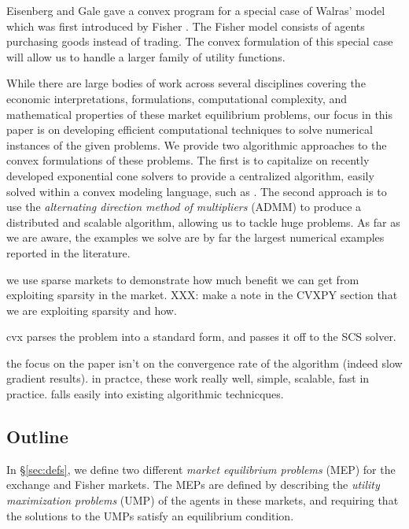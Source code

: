 \documentclass[12pt]{article}
\begin{document}
Eisenberg and Gale \cite{eisenberg1959consensus, gale1960theory,
eisenberg1961aggregation} gave a convex program for a special case of Walras'
model which was first introduced by Fisher \cite[see][]{brainard2000compute}.
The Fisher model consists of agents purchasing goods instead of trading.
The convex formulation of this special case will allow us to handle a larger
family of utility functions.

While there are large bodies of work across several disciplines covering the
economic interpretations, formulations, computational complexity, and
mathematical properties of these market equilibrium problems, our focus in
this paper is on developing efficient computational techniques to solve
numerical instances of the given problems.
We provide two algorithmic approaches to the convex formulations
of these problems. The first is to capitalize on recently
developed exponential cone solvers \cite{scs} to provide a centralized
algorithm, easily solved within a convex modeling language, such as \cite{cvxpy,
cvx}. The second approach is to use the \emph{alternating direction method of
multipliers} (ADMM) \cite{boyd2011distributed} to produce a distributed and
scalable algorithm, allowing us to tackle huge problems.
As far as we are aware, the examples we solve are by far the largest
numerical examples reported in the literature.


we use sparse markets to demonstrate how much benefit we can get from exploiting sparsity in the market.
XXX: make a note in the CVXPY section that we are exploiting sparsity and how.

cvx parses the problem into a standard form, and passes it off to the SCS solver.

the focus on the paper isn't on the convergence rate of the algorithm (indeed slow gradient results).
in practce, these work really well, simple, scalable, fast in practice. falls easily into existing algorithmic technicques.

\subsection{Outline}

In \S\ref{sec:defs}, we define two different \emph{market equilibrium problems}
(MEP) for the exchange and Fisher markets. The MEPs are defined by describing
the \emph{utility maximization problems} (UMP) of the agents in these markets,
and requiring that the solutions to the UMPs satisfy an equilibrium condition.
\end{document}
